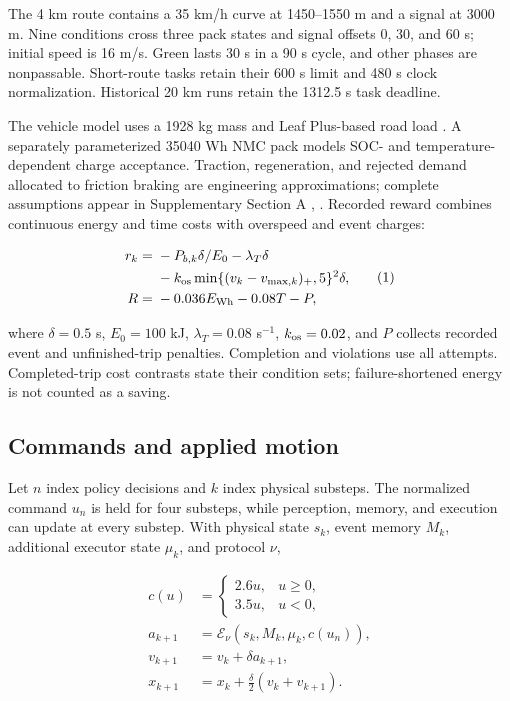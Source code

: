 \documentclass[letterpaper,journal]{IEEEtran}
\begin{document}
The 4 km route contains a 35 km/h curve at 1450--1550 m and a signal at 3000 m. Nine conditions cross three pack states and signal offsets 0, 30, and 60 s; initial speed is 16 m/s. Green lasts 30 s in a 90 s cycle, and other phases are nonpassable. Short-route tasks retain their 600 s limit and 480 s clock normalization. Historical 20 km runs retain the 1312.5 s task deadline.

The vehicle model uses a 1928 kg mass and Leaf Plus-based road load \cite{S4}. A separately parameterized 35040 Wh NMC pack models SOC- and temperature-dependent charge acceptance. Traction, regeneration, and rejected demand allocated to friction braking are engineering approximations; complete assumptions appear in Supplementary Section A \cite{S3}, \cite{S5}. Recorded reward combines continuous energy and time costs with overspeed and event charges:

\[\begin{aligned}
r_k={}&-P_{b,k}\delta/E_0-\lambda_T\delta\\
&-k_{\rm os}\min\{(v_k-v_{\max,k})_+,5\}^2\delta,\\
R={}&-0.036E_{\rm Wh}-0.08T-P,
\end{aligned}\tag{1}\]

where \(\delta=0.5\) s, \(E_0=100\) kJ, \(\lambda_T=0.08\) s\(^{-1}\), \(k_{\rm os}=0.02\), and \(P\) collects recorded event and unfinished-trip penalties. Completion and violations use all attempts. Completed-trip cost contrasts state their condition sets; failure-shortened energy is not counted as a saving.

\subsection{Commands and applied motion}

Let \(n\) index policy decisions and \(k\) index physical substeps. The normalized command \(u_n\) is held for four substeps, while perception, memory, and execution can update at every substep. With physical state \(s_k\), event memory \(M_k\), additional executor state \(\mu_k\), and protocol \(\nu\),

\[\begin{aligned}
c(u)&=\begin{cases}2.6u,&u\ge0,\\3.5u,&u<0,\end{cases}\\
a_{k+1}&=\mathcal E_\nu(s_k,M_k,\mu_k,c(u_n)),\\
v_{k+1}&=v_k+\delta a_{k+1},\\
x_{k+1}&=x_k+\tfrac{\delta}{2}(v_k+v_{k+1}).
\end{aligned}\tag{2}\]
\end{document}
